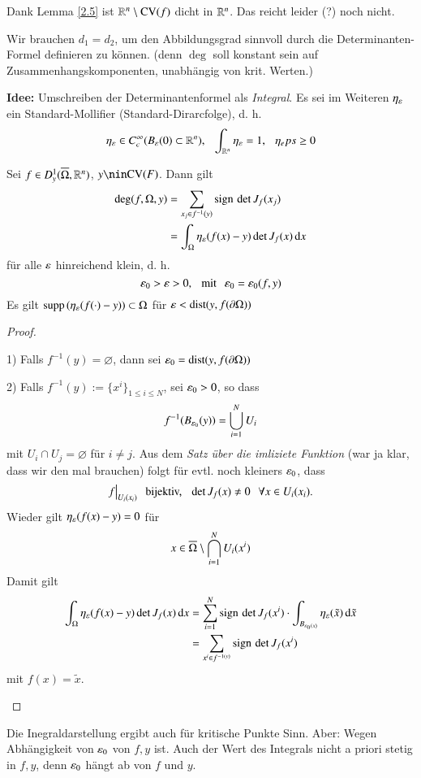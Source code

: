 \noindent Dank Lemma \ref{2.5} ist $\mathbb{R}^n\setminus \mathrm{CV}(f)$ dicht in $\mathbb{R}^n$. Das reicht leider (?)
noch nicht.

\noindent Wir brauchen $d_1=d_2$, um den Abbildungsgrad sinnvoll durch die Determinanten-Formel
definieren zu können. (denn $\deg$ soll konstant sein auf Zusammenhangskomponenten, unabhängig
von krit. Werten.)

\textbf{Idee:} Umschreiben der Determinantenformel als \textit{Integral}.
Es sei im Weiteren $\eta_\varepsilon$ ein Standard-Mollifier (Standard-Dirarcfolge), d. h.
\[
    \eta_\varepsilon \in C^\infty_c(B_\varepsilon(0)\subset \mathbb{R}^n), \hspace{.25cm} \int_{\mathbb{R}^n} \eta_\varepsilon=1,\hspace{.25cm} \eta_eps\geq 0
\]

\begin{lem}\label{2.6}
    Sei $f\in D^1_y(\overline \Omega, \mathbb{R}^n)$, $y\nin \CV(F)$. Dann gilt
    \begin{eqnarray}\label{5}
        \deg(f,\Omega,y)&=\sum_{x_j\in f^{-1}(y)} \mathrm{sign}\, \det J_f(x_j)\\
                        &= \int_\Omega \eta_\varepsilon (f(x)-y) \det J_f(x)\, \mathrm{d} x
    \end{eqnarray}
    für alle $\varepsilon$ hinreichend klein, d. h.
    \[
        \varepsilon_0>\varepsilon>0, \hspace{.25cm} \text{mit} \hspace{.25cm} \varepsilon_0=\varepsilon_0(f,y)
    \]
    Es gilt $\mathrm{supp}\, (\eta_\varepsilon(f(\cdot)-y))\subset \Omega$ für $\varepsilon < \mathrm{dist}(y,f(\partial \Omega))$
\end{lem}

\begin{proof}
    \begin{description}
        \item{1)} 
        Falls $f^{-1}(y)=\varnothing$, dann sei $\varepsilon_0=\mathrm{dist}(y,f(\partial \Omega))$
        \item{2)}
        Falls $f^{-1}(y):= \{x^i\}_{1\leq i \leq N}$, sei $\varepsilon_0>0$, so dass
        \[
            f^{-1}(B_{\varepsilon_0}(y)) = \bigcup_{i=1}^N U_i
        \]
        mit $U_i\cap U_j=\varnothing$ für $i\neq j$.
        Aus dem \textit{Satz über die imliziete Funktion} (war ja klar, dass wir den mal brauchen)
        folgt für evtl. noch kleiners $\varepsilon_0$, dass
        \[
            f\big|_{U_i(x_i)} \hspace{.25cm} \text{bijektiv,} \hspace{.25cm} \det J_f(x)\neq 0 \hspace{.25cm} \forall x \in U_i(x_i).
        \]
        Wieder gilt $\eta _{\varepsilon}(f(x)-y)=0$ für
        \[
            x\in \overline \Omega \setminus \bigcap _{i=1}^N U_i(x^i)
        \]
        Damit gilt
        \begin{align*}
            \int_\Omega \eta_\varepsilon(f(x)-y) \det J_f(x) \, \mathrm{d} x&= \sum_{i=1}^N \mathrm{sign}\, \det J_f(x^i)\cdot
            \int_{B_{\varepsilon_0(x)}}\eta_\varepsilon (\tilde x ) \, \mathrm{d} \tilde x\\
            &=\sum_{x^i\in f^{-1(y)}} \mathrm{sign}\, \det J_f(x^i)
        \end{align*}
        mit $f(x)=\tilde x$.
    \end{description}
    \[ \]
\end{proof}
Die Inegraldarstellung ergibt auch für kritische Punkte Sinn. Aber:
Wegen Abhängigkeit von $\varepsilon_0$ von $f,y$ ist. Auch der Wert des Integrals nicht a priori stetig in 
$f,y$, denn $\varepsilon_0$ hängt ab von $f$ und $y$.


